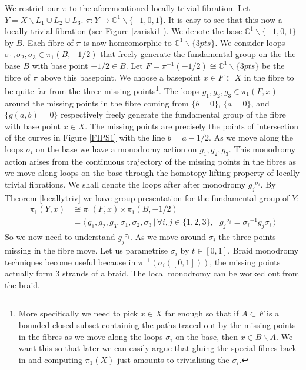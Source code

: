 \documentclass[oneside,reqno]{amsart}
\theoremstyle{definition}
\theoremstyle{definition}
\theoremstyle{definition}
\theoremstyle{definition}
\newcommand{\CC}{\mathbb{C}}
\begin{document}
We restrict our $\pi$ to the aforementioned locally trivial fibration. Let $Y= X \backslash L_1 \cup L_2 \cup L_3$. $\pi : Y  \to \CC^1\backslash \{-1,0,1 \}$. It is easy to see that this now a locally trivial fibration (see Figure \ref{zariski1}). We denote the base $\CC^1\backslash \{-1,0,1 \}$ by $B$. Each fibre of $\pi$ is now homeomorphic to $\CC^1 \backslash \{3 pts\}$. We consider loops $\sigma_1,\sigma_2, \sigma_3 \in \pi_1(B,-1/2)$ that freely generate the fundamental group on the the base $B$ with base point $-1/2 \in B$. Let $F=\pi^{-1}(-1/2)\cong \CC^1\backslash \{ 3 pts\}$ be the fibre of $\pi$ above this basepoint. We choose a basepoint $x \in F \subset X$ in the fibre to be quite far from the three missing points\footnote{More specifically we need to pick $x \in X$ far enough so that if $A\subset F$ is a bounded closed subset containing the paths traced out by the missing points in the fibres as we move along the loops $\sigma_i$ on the base, then $x \in B\backslash A$. We want this so that later we can easily argue that gluing the special fibres back in and computing $\pi_1(X)$ just amounts to trivialising the $\sigma_i$.}. The loops $g_1,g_2,g_3 \in \pi_1(F,x)$ around the missing points in the fibre coming from $\{b=0 \}$, $\{ a=0\}$, and $\{g(a,b)=0\}$ respectively freely generate the fundamental group of the fibre with base point $x \in X$. The missing points are precisely the points of intersection of the curves in Figure \ref{FIPS1} with the line $b=a-1/2$. As we move along the loops $\sigma_i$ on the base we have a monodromy action on $g_1,g_2,g_3$. This monodromy action arises from the continuous trajectory of the missing points in the fibres as we move along loops on the base through the homotopy lifting property of locally trivial fibrations. We shall denote the loops after after monodromy ${g_j}^{\sigma_i}$. By Theorem \ref{locallytriv} we have group presentation for the fundamental group of $Y$:
\begin{align*}
    \pi_1(Y,x) &\cong \pi_1(F,x) \rtimes \pi_1(B,-1/2)  \\
    &=\langle \, g_1,g_2,g_3,\sigma_1,\sigma_2,\sigma_3 \, | \,\forall i,j \in \{1,2,3 \}, \: \: \: {g_j}^{\sigma_i}={\sigma_i}^{-1} g_j \sigma_i \, \rangle
\end{align*}
So we now need to understand ${g_j}^{\sigma_i}$. As we move around $\sigma_i$ the three points missing in the fibre move. Let us parametrise $\sigma_i$ by $t \in [0,1 ]$. Braid monodromy techniques become useful because in $\pi^{-1}(\sigma_i([0,1]))$, the missing points actually form 3 strands of a braid. The local monodromy can be worked out from the braid. \\
\end{document}
